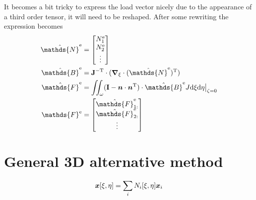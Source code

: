 \documentclass[a4paper,11pt]{article}
\renewcommand{\to}[1]{\text{\boldmath $#1$}} %
\newcommand{\ts}[1]{\text{\boldmath $\mathrm{#1}$}} %
\newcommand{\uv}[1]{\mathds{#1}}
\newcommand{\um}[1]{\mathds{#1}}
\newcommand{\intd}[1]{\mathrm{d}#1}
\newcommand{\T}{\mathrm{T}}
\newcommand{\element}{\mathrm{e}}
\begin{document}
It becomes a bit tricky to express the load vector nicely due to the appearance of a third order tensor, it will need to be reshaped.
After some rewriting the expression becomes
\begin{align}
 \hat{\uv N}^\element &= \begin{bmatrix} N_1^\element\\ N_2^\element\\ \vdots\end{bmatrix}\\
 \hat{\um B}^\element &= \ts J^{-\T}\cdot(\to\nabla_\xi\cdot(\hat{\uv N}^\element)^\T)\\
 \hat{\um F}^\element &= \iint_\omega(\ts I-\to n \cdot \to n^\T)\cdot \hat{\um B}^\element J\intd\xi\intd\eta\big|_{\zeta=0}\\
 \uv F^\element &= \begin{bmatrix}\hat{\uv F}^\element_{1:}\\\hat{\uv F}^\element_{2:}\\\vdots\end{bmatrix}
\end{align}




\section{General 3D alternative method}
\begin{align}
 \to x[\xi,\eta] = \sum_i N_i[\xi,\eta]\to x_i
\end{align}
\end{document}
